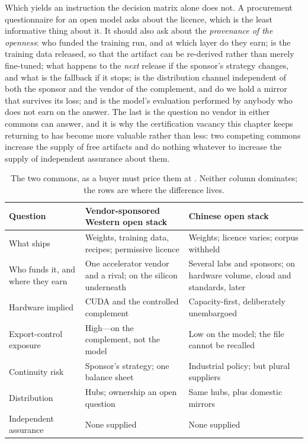 Which yields an instruction the decision matrix alone does not. A procurement questionnaire for an open model asks about the licence, which is the least informative thing about it. It should also ask about the \emph{provenance of the openness}: who funded the training run, and at which layer do they earn; is the training data released, so that the artifact can be re-derived rather than merely fine-tuned; what happens to the \emph{next} release if the sponsor's strategy changes, and what is the fallback if it stops; is the distribution channel independent of both the sponsor and the vendor of the complement, and do we hold a mirror that survives its loss; and is the model's evaluation performed by anybody who does not earn on the answer. The last is the question no vendor in either commons can answer, and it is why the certification vacancy this chapter keeps returning to has become more valuable rather than less: two competing commons increase the supply of free artifacts and do nothing whatever to increase the supply of independent assurance about them.

\begin{table}[htbp]
  \centering\footnotesize
  \caption{The two commons, as a buyer must price them at \datafreeze. Neither column dominates; the rows are where the difference lives.}
  \label{tab:two-commons}
  \begin{tabular}{p{28mm}p{50mm}p{50mm}}
    \toprule
    Question & Vendor-sponsored Western open stack & Chinese open stack \\
    \midrule
    What ships & Weights, training data, recipes; permissive licence & Weights; licence varies; corpus withheld \\
    \addlinespace
    Who funds it, and where they earn & One accelerator vendor and a rival; on the silicon underneath & Several labs and sponsors; on hardware volume, cloud and standards, later \\
    \addlinespace
    Hardware implied & CUDA and the controlled complement & Capacity-first, deliberately unembargoed \\
    \addlinespace
    Export-control exposure & High---on the complement, not the model & Low on the model; the file cannot be recalled \\
    \addlinespace
    Continuity risk & Sponsor's strategy; one balance sheet & Industrial policy; but plural suppliers \\
    \addlinespace
    Distribution & Hubs; ownership an open question~\cite{nvda-hf} & Same hubs, plus domestic mirrors \\
    \addlinespace
    Independent assurance & None supplied & None supplied \\
    \bottomrule
  \end{tabular}
\end{table}

